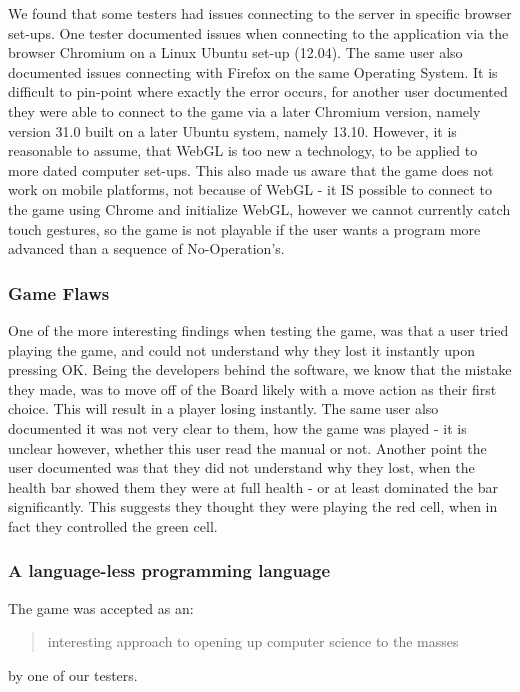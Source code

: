 We found that some testers had issues connecting to the server in specific browser set-ups. One tester documented issues when connecting to the application via the browser Chromium on a Linux Ubuntu set-up (12.04). The same user also documented issues connecting with Firefox on the same Operating System. It is difficult to pin-point where exactly the error occurs, for another user documented they were able to connect to the game via a later Chromium version, namely version 31.0 built on a later Ubuntu system, namely 13.10. However, it is reasonable to assume, that WebGL is too new a technology, to be applied to more dated computer set-ups. This also made us aware that the game does not work on mobile platforms, not because of WebGL - it IS possible to connect to the game using Chrome and initialize WebGL, however we cannot currently catch touch gestures, so the game is not playable if the user wants a program more advanced than a sequence of No-Operation's.

\subsubsection{Game Flaws}

One of the more interesting findings when testing the game, was that a user tried playing the game, and could not understand why they lost it instantly upon pressing OK. Being the developers behind the software, we know that the mistake they made, was to move off of the Board likely with a move action as their first choice. This will result in a player losing instantly. The same user also documented it was not very clear to them, how the game was played - it is unclear however, whether this user read the manual or not. Another point the user documented was that they did not understand why they lost, when the health bar showed them they were at full health - or at least dominated the bar significantly. This suggests they thought they were playing the red cell, when in fact they controlled the green cell.

\subsubsection{A language-less programming language}

The game was accepted as an: 

\begin{quotation}interesting approach to opening up computer science to the masses\end{quotation} by one of our testers.

